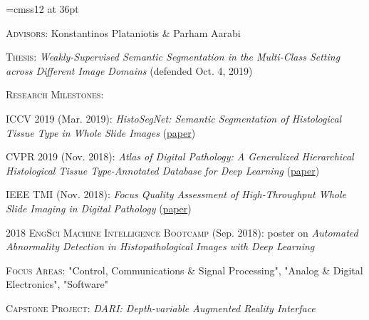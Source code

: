 \documentclass[12pt]{cv_style}
\begin{document}
\font\titlefont=cmss12 at 36pt


\flushleft{}
\begin{ditem}
	\item \textsc{Advisors:} Konstantinos Plataniotis \& Parham Aarabi
	\item \textsc{Thesis:} \textit{Weakly-Supervised Semantic Segmentation in the Multi-Class Setting across Different Image Domains} (defended Oct. 4, 2019)
	\item \textsc{Research Milestones:}
	\begin{ditem}
		\item \textsc{ICCV 2019} (Mar. 2019): \emph{HistoSegNet: Semantic Segmentation of Histological Tissue Type
in Whole Slide Images} (\href{http://openaccess.thecvf.com/content_ICCV_2019/papers/Chan_HistoSegNet_Semantic_Segmentation_of_Histological_Tissue_Type_in_Whole_Slide_ICCV_2019_paper.pdf}{paper})
		\item \textsc{CVPR 2019} (Nov. 2018): \emph{Atlas of Digital Pathology: A Generalized Hierarchical Histological Tissue Type-Annotated Database for Deep Learning} (\href{http://openaccess.thecvf.com/content_CVPR_2019/html/Hosseini_Atlas_of_Digital_Pathology_A_Generalized_Hierarchical_Histological_Tissue_Type-Annotated_CVPR_2019_paper.html}{paper})
		\item \textsc{IEEE TMI} (Nov. 2018): \emph{Focus Quality Assessment of High-Throughput Whole Slide Imaging in Digital Pathology} (\href{https://arxiv.org/abs/1811.06038}{paper})
		\item \textsc{2018 EngSci Machine Intelligence Bootcamp} (Sep. 2018): poster on \emph{Automated Abnormality Detection in Histopathological Images with Deep Learning}
	\end{ditem}
\end{ditem}
\medspace
{}
\begin{ditem}
	\item \textsc{Focus Areas:} "Control, Communications \& Signal Processing", "Analog \& Digital Electronics", "Software"
	\item \textsc{Capstone Project:} \textit{DARI: Depth-variable Augmented Reality Interface}	
\end{ditem}
\end{document}
